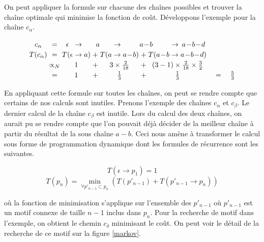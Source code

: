 On peut appliquer la formule sur chacune des chaînes possibles et trouver la chaîne optimale qui minimise la fonction de
coût. Développons l'exemple pour la chaîne $c_{\alpha}$.

\[
\arraycolsep=1.4pt\def\arraystretch{1.2}
\begin{array}{cccccccccccccc}
  c_\alpha    & =  & \epsilon &  \rightarrow &  \multicolumn{3}{c}{a} & \rightarrow & \multicolumn{3}{c}{a\!-\!b} &  \rightarrow & \multicolumn{1}{c}{a\!-\!b\!-\!d} &\\
  T(c_\alpha)   & =  & T( \epsilon &  \rightarrow &  a)  & + & T( a &  \rightarrow  & a\!-\!b) & + & T(a\!-\!b &  \rightarrow & a\!-\!b\!-\!d) &\\
                    & \propto_{N}  &  \multicolumn{3}{c}{1} &  + & \multicolumn{3}{c}{3 \times \frac{2}{18}} & + & \multicolumn{3}{c}{  (3-1)\times \frac{2}{18} \times \frac{3}{2}} &\\
                    & = &  \multicolumn{3}{c}{1} &  + & \multicolumn{3}{c}{\frac{1}{3}} & + & \multicolumn{3}{c}{\frac{1}{3}}   & \quad= \quad\frac{5}{3} \\

\end{array}
\]

En appliquant cette formule sur toutes les chaînes, on peut se rendre compte que certains de nos calculs sont inutiles.
Prenons l'exemple des chaînes $c_{\alpha}$ et $c_{\beta}$. Le dernier calcul de la chaîne $c_{\beta}$ est inutile.
Lors du calcul des deux chaînes, on aurait pu se rendre compte que l'on pouvait déjà décider de la meilleur chaîne à partir du résultat de la sous chaîne $a-b$.
Ceci nous amène à transformer le calcul sous forme de programmation dynamique dont les formules de récurrence sont les suivantes.


\begin{equation}
 T(\epsilon \rightarrow p_1) = 1
\end{equation}
\begin{equation}
 T(p_n) = \min_{\forall p'_{n-1} \subset p_n} (T(p'_{n-1}) + T(p'_{n-1} \rightarrow p_n))
\end{equation}

où la fonction de minimisation s'applique sur l'ensemble des $p'_{n-1}$ où $p'_{n-1}$ est un motif connexe de taille $n-1$ inclus
dans $p_n$. Pour la recherche de motif dans l'exemple, on obtient le chemin $c_{\delta}$ minimisant le coût. On peut voir le
détail de la recherche de ce motif sur la figure \ref{markov}.

